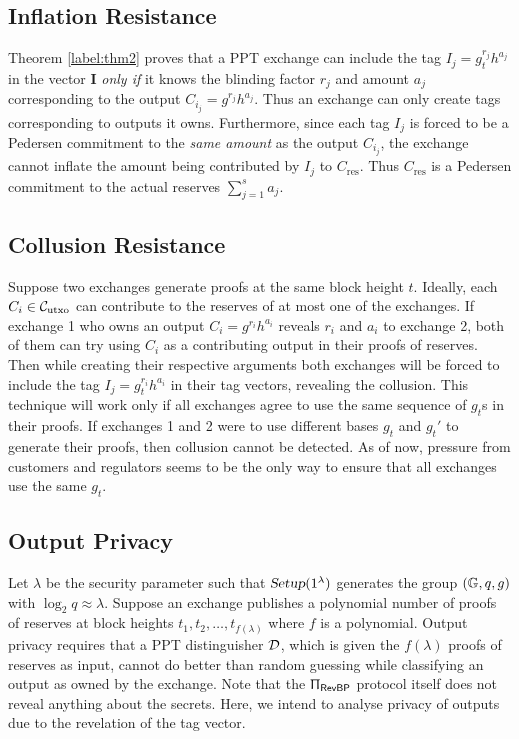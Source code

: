  \subsection{Inflation Resistance}
  \vspace{-4pt}
  Theorem \ref{label:thm2} proves that a \textsf{PPT} exchange can include the tag $I_j = g_t^{r_j}h^{a_j}$ in the vector $\textbf{I}$ \textit{only if} it knows the blinding factor $r_j$ and amount $a_j$ corresponding to the output $C_{i_j} = g^{r_j}h^{a_j}$. Thus an exchange can only create tags corresponding to outputs it owns. Furthermore, since each tag $I_j$ is forced to be a Pedersen commitment to the \textit{same amount} as the output $C_{i_j}$, the exchange cannot inflate the amount being contributed by $I_j$ to $C_{\text{res}}$. Thus $C_{\text{res}}$ is a Pedersen commitment to the actual reserves $\sum_{j=1}^{s} a_j$.
  
  \subsection{Collusion Resistance}
  \vspace{-4pt}
  Suppose two exchanges generate \RPlus proofs at the same block height $t$. Ideally, each $C_i \in \mathcal{C}_{\text{utxo}}$ can contribute to the reserves of at most one of the exchanges. If exchange 1 who owns an output $C_i = g^{r_i}h^{a_i}$ reveals $r_i$ and $a_i$ to exchange 2, both of them can try using $C_i$ as a contributing output in their proofs of reserves. Then while creating their respective arguments \proto both exchanges will be forced to include the tag $I_j = g_t^{r_i}h^{a_i}$ in their tag vectors, revealing the collusion. This technique will work only if all exchanges agree to use the same sequence of $g_t$s in their \RPlus proofs. If exchanges 1 and 2 were to use different bases $g_t$ and $g_t'$ to generate their proofs, then collusion cannot be detected. As of now, pressure from customers and regulators seems to be the only way to ensure that all exchanges use the same $g_t$.
  
  \subsection{Output Privacy}
  \vspace{-4pt}
  Let $\lambda$ be the security parameter such that $\textsl{Setup}(1^{\lambda})$ generates the group $(\mathbb{G}, q, g)$ with $\log_2 q \approx \lambda$. Suppose an exchange publishes a polynomial number of proofs of reserves at block heights $t_1, t_2, \ldots, t_{f(\lambda)}$ where $f$ is a polynomial.
  Output privacy requires that a \textsf{PPT} distinguisher $\mathcal{D}$, which is given the $f(\lambda)$ proofs of reserves as input, cannot do better than random guessing while classifying an output as owned by the exchange. 
  Note that the $\Uppi_{\textsf{RevBP}}$ protocol itself does not reveal anything about the secrets.
  Here, we intend to analyse privacy of outputs due to the revelation of the tag vector.  
  
